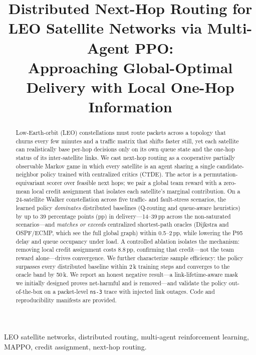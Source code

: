 \documentclass[conference,10pt]{IEEEtran}
\begin{document}
\title{Distributed Next-Hop Routing for LEO Satellite Networks via Multi-Agent PPO:\\
Approaching Global-Optimal Delivery with Local One-Hop Information}

\author{
}

\maketitle

\begin{abstract}
Low-Earth-orbit (LEO) constellations must route packets across a topology that churns every few minutes and a traffic matrix that shifts faster still, yet each satellite can realistically base per-hop decisions only on its own queue state and the one-hop status of its inter-satellite links. We cast next-hop routing as a cooperative partially observable Markov game in which every satellite is an agent sharing a single candidate-neighbor policy trained with centralized critics (CTDE). The actor is a permutation-equivariant scorer over feasible next hops; we pair a global team reward with a zero-mean local credit assignment that isolates each satellite's marginal contribution. On a 24-satellite Walker constellation across five traffic- and fault-stress scenarios, the learned policy \emph{dominates} distributed baselines (Q-routing and queue-aware heuristics) by up to 39 percentage points (pp) in delivery---14--39\,pp across the non-saturated scenarios---and \emph{matches or exceeds} centralized shortest-path oracles (Dijkstra and OSPF/ECMP, which see the full global graph) within 0.5--2\,pp, while lowering the P95 delay and queue occupancy under load. A controlled ablation isolates the mechanism: removing local credit assignment costs 8.8\,pp, confirming that credit---not the team reward alone---drives convergence. We further characterize sample efficiency: the policy surpasses every distributed baseline within 2\,k training steps and converges to the oracle band by 50\,k. We report an honest negative result---a link-lifetime-aware mask we initially designed proves net-harmful and is removed---and validate the policy out-of-the-box on a packet-level \texttt{ns-3} trace with injected link outages. Code and reproducibility manifests are provided.
\end{abstract}

\begin{IEEEkeywords}
LEO satellite networks, distributed routing, multi-agent reinforcement learning, MAPPO, credit assignment, next-hop routing.
\end{IEEEkeywords}
\end{document}
